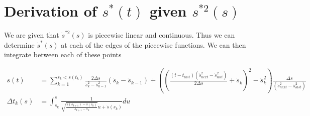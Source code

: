 \chapter{Derivation of $s^*(t)$ given $s^{*2}(s)$}

We are given that $\dot{s}^{*2}(s)$ is piecewise linear and continuous. Thus we can determine $\dot{s}^*(s)$ at each of the edges of the piecewise functions. We can then integrate between each of these points

\begin{align*}
s(t) &= \sum_{k=1}^{s_k < s(t_k)} \frac{2\Delta s}{\dot{s}^2_k - \dot{s}^2_{k-1}} \left(\dot{s}_k -\dot{s}_{k-1}\right) + \left(\left(\frac{(t-t_{last})(\dot{s}^2_{next} - \dot{s}^2_{last})}{2 \Delta s} + \dot{s}_k\right)^2 - \dot{s}^2_k \right)\frac{\Delta s}{(\dot{s}^2_{next} - \dot{s}^2_{last})}\\	
\Delta t_k(s) &= \int_{s_k}^s \frac{1}{\sqrt{\frac{\dot{s}(s_{k+1}) - \dot{s}(s_{k})}{s_{k+1} - s_{k}}} u + \dot{s}(s_{k})} du
\end{align*}